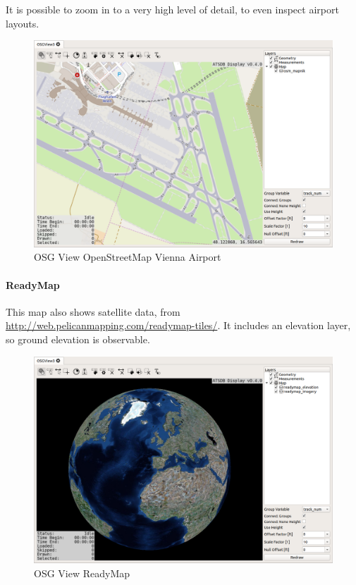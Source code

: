 {It is possible to zoom in to a very high level of detail, to even inspect airport layouts.

\begin{figure}[H]
    \hspace*{-2cm}
    \includegraphics[width=18cm,frame]{../screenshots/osgview_osm_vienna.png}
  \caption{OSG View OpenStreetMap Vienna Airport}
\end{figure}

\newpage
\paragraph{ReadyMap}

This map also shows satellite data, from \url{http://web.pelicanmapping.com/readymap-tiles/}. It includes an elevation layer, so ground elevation is observable.

\begin{figure}[H]
    \hspace*{-2cm}
    \includegraphics[width=18cm,frame]{../screenshots/osgview_ready.png}
  \caption{OSG View ReadyMap}
\end{figure}


}
